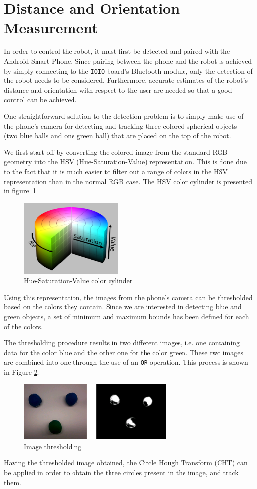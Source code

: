 \documentclass[journal]{IEEEtran}
\let\MYoriglatexcaption\caption
\renewcommand{\caption}[2][\relax]{\MYoriglatexcaption[#2]{#2}}
\begin{document}
\section{Distance and Orientation Measurement}

In order to control the robot, it must first be detected and paired with the Android Smart Phone. Since pairing between the phone and the robot is achieved by simply connecting to the \texttt{IOIO} board's Bluetooth module, only the detection of the robot needs to be considered. Furthermore, accurate estimates of the robot's distance and orientation with respect to the user are needed so that a good control can be achieved.

One straightforward solution to the detection problem is to simply make use of
the phone's camera for detecting and tracking three colored spherical objects
(two blue balls and one green ball) that are placed on the top of the robot.

We first start off by converting the colored image from the standard RGB geometry into the HSV (Hue-Saturation-Value) representation. This is done due to the fact that it is much easier to filter out a range of colors in the HSV representation than in the normal RGB case. The HSV color cylinder is presented in figure~\ref{fig:sim}.
%
\begin{figure}[htpb]
 \centering
\includegraphics[width=2in]{images/hsv_representation}
\caption{Hue-Saturation-Value color cylinder}
\label{fig:sim}
\end{figure}
%
Using this representation, the images from the phone's camera can be thresholded based on the colors they contain. Since we are interested in detecting blue and green objects, a set of minimum and maximum bounds has been defined for each of the colors.

The thresholding procedure results in two different images, i.e. one containing data for the color blue and the other one for the color green. These two images are combined into one through the use of an \texttt{OR} operation. This process is shown in Figure \ref{fig:thresh}.
%
\begin{figure}[htpb]
 \centering
\includegraphics[width=3in]{images/thresholding}
\caption{Image thresholding}
\label{fig:thresh}
\end{figure}
%
Having the thresholded image obtained, the Circle Hough Transform (CHT) can be applied in order to obtain the three circles present in the image, and track them.
\end{document}
